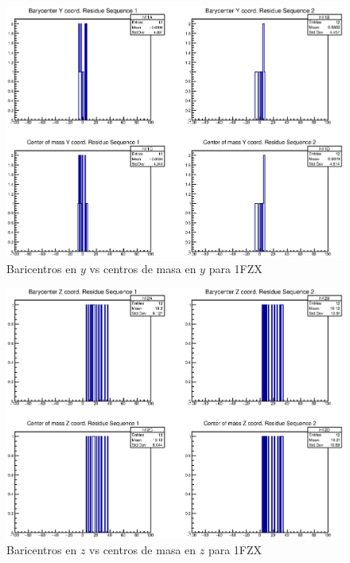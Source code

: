 \begin{figure}[htbp]
    \centering
    \includegraphics[width=1\linewidth]{./Figures/1fzy.eps}
  \caption[Baricentros en $y$ vs centros de masa en $y$ para 1FZX]{Baricentros en $y$ vs centros de masa en $y$ para 1FZX}
    \label{fig:cay}
\end{figure}

\begin{figure}[htbp]
    \centering
    \includegraphics[width=1\linewidth]{./Figures/1fzz.eps}
  \caption[Baricentros en $z$ vs centros de masa en $z$ para 1FZX]{Baricentros en $z$ vs centros de masa en $z$ para 1FZX}
    \label{fig:caz}
\end{figure}
